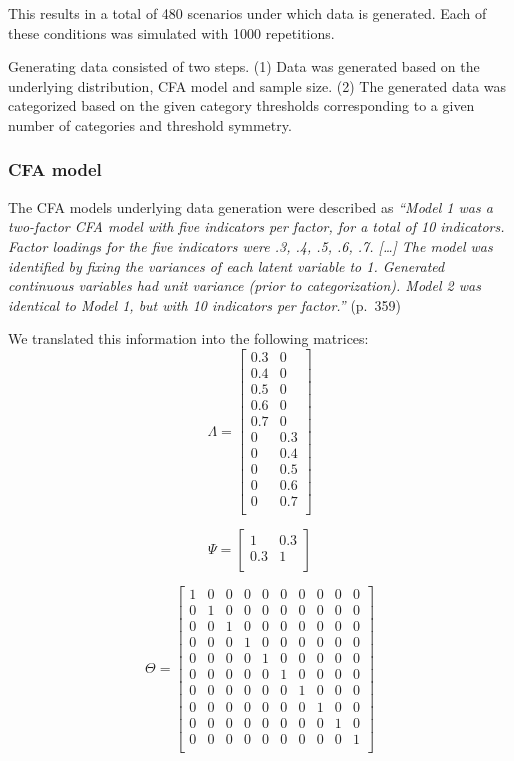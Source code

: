 \documentclass[10,a4paperpaper,]{article}
\begin{document}
This results in a total of 480 scenarios under which data is generated.
Each of these conditions was simulated with 1000 repetitions.

Generating data consisted of two steps. (1) Data was generated based on
the underlying distribution, CFA model and sample size. (2) The
generated data was categorized based on the given category thresholds
corresponding to a given number of categories and threshold symmetry.

\subsubsection{CFA model}

The CFA models underlying data generation were described as
\emph{``Model 1 was a two-factor CFA model with five indicators per
factor, for a total of 10 indicators. Factor loadings for the five
indicators were .3, .4, .5, .6, .7. {[}\ldots{]} The model was
identified by fixing the variances of each latent variable to 1.
Generated continuous variables had unit variance (prior to
categorization). Model 2 was identical to Model 1, but with 10
indicators per factor.''} (p.~359)

We translated this information into the following matrices: \[
\Lambda = 
  \left[ {\begin{array}{cc}
    0.3 & 0 \\
    0.4 & 0\\
    0.5 & 0\\
    0.6 & 0\\
    0.7 & 0\\
    0 & 0.3\\
    0 & 0.4\\
    0 & 0.5\\
    0 & 0.6\\
    0 & 0.7\\
  \end{array} } \right]\]

\[ 
\Psi = 
  \left[ {\begin{array}{cc}
    1 & 0.3 \\
    0.3 & 1\\
  \end{array} } \right]
\]

\[ 
\Theta = 
  \left[ {\begin{array}{cccccccccc}
    1 & 0 & 0 & 0 & 0 & 0 & 0 & 0 & 0 & 0 \\
    0 & 1 & 0 & 0 & 0 & 0 & 0 & 0 & 0 & 0\\
    0 & 0 & 1 & 0 & 0 & 0 & 0 & 0 & 0 & 0 \\
    0 & 0 & 0 & 1 & 0 & 0 & 0 & 0 & 0 & 0\\
    0 & 0 & 0 & 0 & 1 & 0 & 0 & 0 & 0 & 0 \\
    0 & 0 & 0 & 0 & 0 & 1 & 0 & 0 & 0 & 0\\
    0 & 0 & 0 & 0 & 0 & 0 & 1 & 0 & 0 & 0 \\
    0 & 0 & 0 & 0 & 0 & 0 & 0 & 1 & 0 & 0\\
    0 & 0 & 0 & 0 & 0 & 0 & 0 & 0 & 1 & 0 \\
    0 & 0 & 0 & 0 & 0 & 0 & 0 & 0 & 0 & 1\\
  \end{array} } \right]
\]
\end{document}
